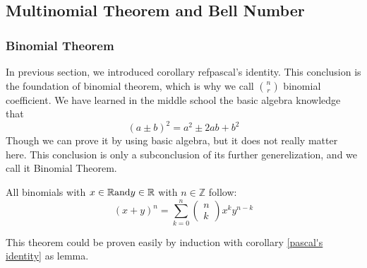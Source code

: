         \subsection{Multinomial Theorem and Bell Number}
        \subsubsection*{Binomial Theorem}
        In previous section, we introduced corollary ref{pascal's identity}. This conclusion is the foundation
        of binomial theorem, which is why we call $\binom{n}{r}$ binomial coefficient. We have learned in the
        middle school the basic algebra knowledge that 
        \begin{equation}
            (a\pm b)^2 = a^2 \pm 2ab + b^2 
        \end{equation}
        Though we can prove it by using basic algebra, but it does not really matter here. This conclusion
        is only a subconclusion of its further generelization, and we call it Binomial Theorem.
        \begin{theorem}\label{BT}
            All binomials with $x\in \mathbb{R}\space \text{and}\space y\in \mathbb{R}$ with $n \in 
            \mathbb{Z}$ follow: $$(x+y)^{n}=\sum_{k=0}^{n}\left(\begin{array}{l}n \\k\end{array}\right) x^{k} y^{n-k}$$
        \end{theorem}
        This theorem could be proven easily by induction with corollary \ref{pascal's identity} as lemma.
